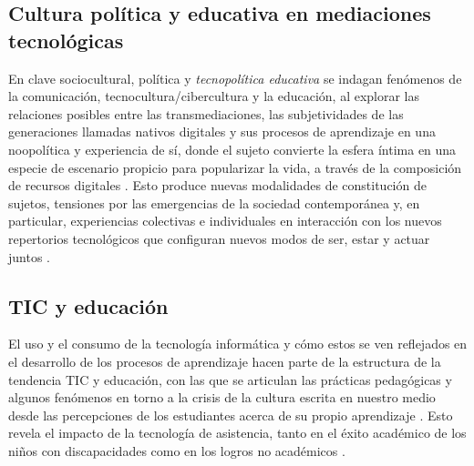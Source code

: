 \documentclass{textolivre}
\begin{document}
\subsection{Cultura política y educativa en mediaciones tecnológicas}\label{sec-cultura}
En clave sociocultural, política y \textit{tecnopolítica educativa} \cite{rueda_ortiz_tecnocultura_2004b} se indagan fenómenos de la comunicación, tecnocultura/cibercultura y la educación, al explorar las relaciones posibles entre las transmediaciones, las subjetividades de las generaciones llamadas nativos digitales \cite{chaparro-hurtado_consumo_2013} y sus procesos de aprendizaje \cite{amador_transmediaciones_2014, munoz_culturas_2010a} en una noopolítica y experiencia de sí, donde el sujeto convierte la esfera íntima en una especie de escenario propicio para popularizar la vida, a través de la composición de recursos digitales \cite{amador_infancias_2013}. Esto produce nuevas modalidades de constitución de sujetos, tensiones por las emergencias de la sociedad contemporánea y, en particular, experiencias colectivas e individuales en interacción con los nuevos repertorios tecnológicos que configuran nuevos modos de ser, estar y actuar juntos \cite{barrios_tao_subjetividades_2015, fonseca_rueda_2012, ramirez_cabanzo_infancias_2013, rueda_tecnocultura_2004a, rueda_ortiz_tecnocultura_2004b, rueda_cultura_2007}.

\subsection{TIC y educación}\label{sec-modelo}
El uso y el consumo de la tecnología informática y cómo estos se ven reflejados en el desarrollo de los procesos de aprendizaje hacen parte de la estructura de la tendencia TIC y educación, con las que se articulan las prácticas pedagógicas \cite{carvajal_tecnocultura_2013} y algunos fenómenos en torno a la crisis de la cultura escrita en nuestro medio \cite{carvajal_barrios_jovenes_2005} desde las percepciones de los estudiantes acerca de su propio aprendizaje \cite{bagdasarov_influence_2017}. Esto revela el impacto de la tecnología de asistencia, tanto en el éxito académico de los niños con discapacidades como en los logros no académicos \cite{harper_assistive_2017}.
\end{document}
